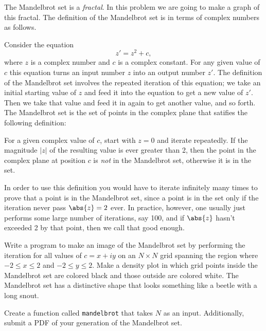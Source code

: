 \documentclass[11pt,letterpaper]{article}
\begin{document}
\begin{problem}
 The Mandelbrot set is a \emph{fractal}. In this problem we are going to make a graph of this 
fractal. The definition of the Mandelbrot set is in terms of complex numbers as follows.

Consider the equation
\[
z'=z^2+c,
\]
where $z$ is a complex number and $c$ is a complex constant. For any given value of $c$ this equation
turns an input number $z$ into an output number $z'$. The definition of the Mandelbrot set involves the
repeated iteration of this equation; we take an initial starting value of $z$ and feed it into the
equation to get a new value of $z'$. Then we take that value and feed it in again to get another 
value, and so forth. The Mandelbrot set is the set of points in the complex plane that satifies
the following definition:


For a given complex value of $c$, start with $z=0$ and iterate repeatedly. If the magnitude 
$\left\vert z\right\vert$ of the resulting value is ever greater than 2, then the point in the
complex plane at position $c$ is \emph{not} in the Mandelbrot set, otherwise it is in the set.


In order to use this definition you would have to iterate infinitely many times to prove that a point
is in the Mandelbrot set, since a point is in the set only if the iteration never pass $\abs{z}=2$
ever. In practice, however, one usually just performs some large number of iterations, say 100, and
if $\abs{z}$ hasn't exceeded 2 by that point, then we call that good enough.

Write a program to make an image of the Mandelbrot set by performing the iteration for all values
of $c=x+iy$ on an $N\times N$ grid spanning the region where $-2\le x\le 2$ and $-2\le y\le 2$. 
Make a density plot in which grid points inside the Mandelbrot set are colored black and those
outside are colored white. The Mandelbrot set has a distinctive shape that looks something like a beetle
with a long snout.

Create a function called \texttt{mandelbrot} that takes $N$ as an input. Additionally, submit a PDF
of your generation of the Mandelbrot set.
\end{problem}
\end{document}
